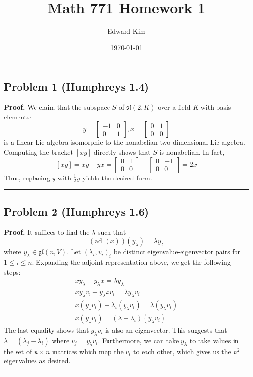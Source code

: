 \documentclass[12pt]{article}%
\newenvironment{proof}[1][Proof]{\textbf{#1.} }{\ \rule{0.5em}{0.5em}}
\begin{document}
\title{Math 771 Homework 1}
\author{Edward Kim}
\date{\today}
\maketitle

\subsection*{Problem 1 (Humphreys 1.4)}

\begin{proof}
  We claim that the subspace $S$ of $\mathfrak{sl}(2,K)$ over a field $K$ with basis elements:
  $$y = \left[ \begin{array}{ccc}
    -1 & 0 \\
    0 & 1 \end{array} \right], x = \left[ \begin{array}{ccc}
      0 & 1 \\
      0 & 0 \end{array} \right] $$ is a linear Lie algebra isomorphic to the nonabelian two-dimensional Lie algebra. Computing the bracket $[xy]$ directly shows that $S$ is nonabelian. In fact,
      $$ [xy] = xy - yx = \left[ \begin{array}{ccc} 0 & 1 \\ 0 & 0 \end{array} \right] - \left[ \begin{array}{ccc} 0 & -1 \\ 0 & 0 \end{array} \right] = 2x $$ Thus, replacing $y$ with $\frac{1}{2}y$ yields the desired form.
\end{proof}

\subsection*{Problem 2 (Humphreys 1.6)}
  \begin{proof}
    It suffices to find the $\lambda$ such that
    $$ (\text{ad }(x))(y_{\lambda}) = \lambda y_{\lambda}$$ where $y_{\lambda} \in \mathfrak{gl}(n,V)$. Let $(\lambda_i, v_i)_i$ be distinct eigenvalue-eigenvector pairs for $1 \leq i \leq n$.
    Expanding the adjoint representation above, we get the following steps:
    \begin{gather}
      xy_{\lambda} - y_{\lambda}x = \lambda y_{\lambda} \\
      xy_{\lambda}v_i - y_{\lambda}xv_i = \lambda y_{\lambda}v_i \\
      x(y_{\lambda}v_i) - \lambda_i(y_{\lambda}v_i) = \lambda (y_{\lambda}v_i) \\
      x(y_{\lambda}v_i)  = (\lambda + \lambda_i) (y_{\lambda}v_i)
    \end{gather}
    The last equality shows that $y_{\lambda}v_i$ is also an eigenvector. This suggests that $\lambda = (\lambda_j - \lambda_i)$ where $v_j = y_{\lambda}v_i$. Furthermore, we can take $y_{\lambda}$ to take values in the set of $n \times n$ matrices which map the $v_i$ to each other, which gives us the $n^2$ eigenvalues as desired.
  \end{proof}
\end{document}

